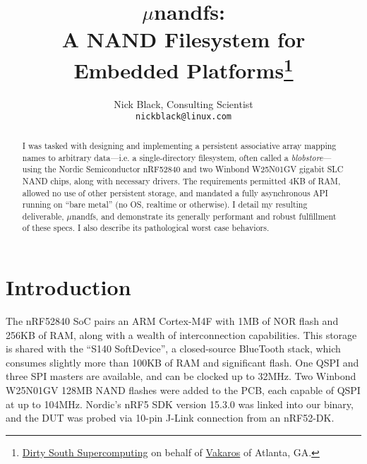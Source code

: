 \documentclass[letterpaper,10pt]{article}
\title{$\mu$nandfs:\\
A NAND Filesystem for Embedded Platforms\thanks{
 \href{https://www.dsscaw.com/}{Dirty South Supercomputing} on behalf
 of \href{https://www.vakaros.com/}{Vakaros} of Atlanta, GA.
}\\
}
\author{Nick Black, Consulting Scientist\\
\texttt{nickblack@linux.com}
}
\begin{document}
\maketitle
\thispagestyle{fancy}
\date{}
\begin{abstract}
\setlength{\parindent}{0pt}
I was tasked with designing and implementing a persistent associative array
mapping names to arbitrary data---i.e. a single-directory filesystem, often called a
\textit{blobstore}---using the Nordic Semiconductor nRF52840 and two Winbond
W25N01GV gigabit SLC NAND chips, along with necessary drivers. The requirements permitted 4KB of RAM,
allowed no use of other persistent storage, and mandated a fully asynchronous
API running on ``bare metal'' (no OS, realtime or otherwise). I detail my
resulting deliverable, $\mu$nandfs, and demonstrate its generally performant
and robust fulfillment of these specs. I also describe its pathological worst
case behaviors.
\end{abstract}
\section{Introduction}
The nRF52840\parencite{nrf52840} SoC pairs an ARM Cortex-M4F with 1MB of
NOR flash and 256KB of RAM, along with a wealth of interconnection
capabilities. This storage is shared with the ``S140
SoftDevice''\parencite{s140}, a closed-source BlueTooth stack, which consumes
slightly more than 100KB of RAM and significant flash. One QSPI and three SPI
masters are available, and can be clocked up to 32MHz. Two Winbond W25N01GV\parencite{winbond}
128MB NAND flashes were added to the PCB, each capable of QSPI at up to 104MHz.
Nordic's nRF5 SDK\parencite{nrf52sdk} version 15.3.0 was linked into our binary,
and the DUT was probed via 10-pin J-Link\parencite{segger} connection from
an nRF52-DK\parencite{nrf52dk}.

\printbibliography
\end{document}
